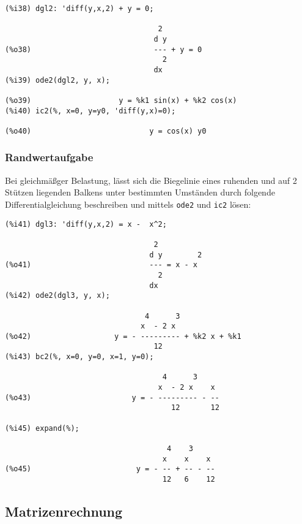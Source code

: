 \documentclass[12pt]{scrartcl}
\begin{document}
\begin{verbatim}
(%i38) dgl2: 'diff(y,x,2) + y = 0;

                                   2
                                  d y
(%o38)                            --- + y = 0
                                    2
                                  dx
(%i39) ode2(dgl2, y, x);

(%o39)                    y = %k1 sin(x) + %k2 cos(x)
(%i40) ic2(%, x=0, y=y0, 'diff(y,x)=0);

(%o40)                           y = cos(x) y0
\end{verbatim}

\subsubsection*{Randwertaufgabe}
Bei gleichmäßger Belastung, lässt sich die Biegelinie
eines ruhenden und auf 2 Stützen liegenden Balkens unter bestimmten
Umständen durch folgende Differentialgleichung beschreiben und mittels
\texttt{ode2} und \texttt{ic2} lösen:

\begin{verbatim}
(%i41) dgl3: 'diff(y,x,2) = x -  x^2;

                                  2
                                 d y        2
(%o41)                           --- = x - x
                                   2
                                 dx
(%i42) ode2(dgl3, y, x);

                                4      3
                               x  - 2 x
(%o42)                   y = - --------- + %k2 x + %k1
                                  12
(%i43) bc2(%, x=0, y=0, x=1, y=0);

                                    4      3
                                   x  - 2 x    x
(%o43)                       y = - --------- - --
                                      12       12

(%i45) expand(%);

                                     4    3
                                    x    x    x
(%o45)                        y = - -- + -- - --
                                    12   6    12
\end{verbatim}

\subsection{Matrizenrechnung}
\end{document}
